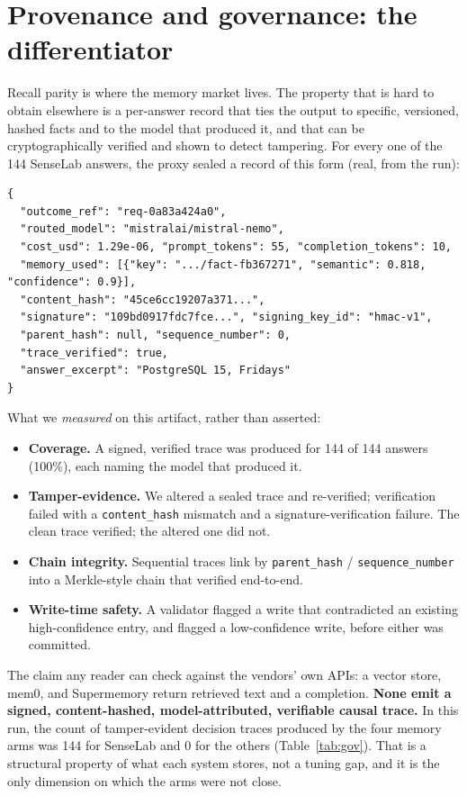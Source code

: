 \documentclass[11pt]{article}
\begin{document}
\section{Provenance and governance: the differentiator}\label{sec:gov}

Recall parity is where the memory market lives. The property that is hard to obtain elsewhere
is a per-answer record that ties the output to specific, versioned, hashed facts and to the
model that produced it, and that can be cryptographically verified and shown to detect
tampering. For every one of the 144 SenseLab answers, the proxy sealed a record of this form
(real, from the run):

\begin{lstlisting}[style=trace]
{
  "outcome_ref": "req-0a83a424a0",
  "routed_model": "mistralai/mistral-nemo",
  "cost_usd": 1.29e-06, "prompt_tokens": 55, "completion_tokens": 10,
  "memory_used": [{"key": ".../fact-fb367271", "semantic": 0.818, "confidence": 0.9}],
  "content_hash": "45ce6cc19207a371...",
  "signature": "109bd0917fdc7fce...", "signing_key_id": "hmac-v1",
  "parent_hash": null, "sequence_number": 0,
  "trace_verified": true,
  "answer_excerpt": "PostgreSQL 15, Fridays"
}
\end{lstlisting}

\noindent What we \emph{measured} on this artifact, rather than asserted:

\begin{itemize}[topsep=2pt,itemsep=1pt]
\item \textbf{Coverage.} A signed, verified trace was produced for 144 of 144 answers
  (100\%), each naming the model that produced it.
\item \textbf{Tamper-evidence.} We altered a sealed trace and re-verified; verification
  failed with a \texttt{content\_hash} mismatch and a signature-verification failure. The
  clean trace verified; the altered one did not.
\item \textbf{Chain integrity.} Sequential traces link by \texttt{parent\_hash} /
  \texttt{sequence\_number} into a Merkle-style chain that verified end-to-end.
\item \textbf{Write-time safety.} A validator flagged a write that contradicted an existing
  high-confidence entry, and flagged a low-confidence write, before either was committed.
\end{itemize}

The claim any reader can check against the vendors' own APIs: a vector store, mem0, and
Supermemory return retrieved text and a completion. \textbf{None emit a signed,
content-hashed, model-attributed, verifiable causal trace.} In this run, the count of
tamper-evident decision traces produced by the four memory arms was 144 for SenseLab and 0 for
the others (Table~\ref{tab:gov}). That is a structural property of what each system stores,
not a tuning gap, and it is the only dimension on which the arms were not close.
\end{document}
